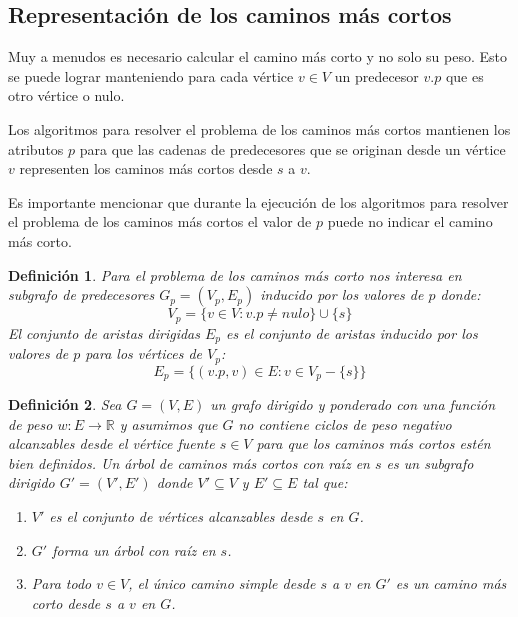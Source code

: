\documentclass[12pt]{article}
\newcommand{\nl}{\vspace{0.3cm}}
\newtheorem{definition}{Definición}
\begin{document}
\subsection{Representación de los caminos más cortos}

\nl

Muy a menudos es necesario calcular el camino más corto y no solo su peso. Esto se puede lograr manteniendo para cada vértice $v \in V$ un predecesor $v.p$ que es otro vértice o nulo. 

\nl

Los algoritmos para resolver el problema de los caminos más cortos mantienen los atributos $p$ para que las cadenas de predecesores que se originan desde un vértice $v$ representen los caminos más cortos desde $s$ a $v$.

\nl

Es importante mencionar que durante la ejecución de los algoritmos para resolver el problema de los caminos más cortos el valor de $p$ puede no indicar el camino más corto.

\begin{definition}
	Para el problema de los caminos más corto nos interesa en subgrafo de predecesores $G_p = (V_p, E_p)$ inducido por los valores de $p$ donde:
	$$ V_p = \{v \in V: v.p \neq nulo \} \cup \{s\} $$
	El conjunto de aristas dirigidas $E_p$ es el conjunto de aristas inducido por los valores de $p$ para los vértices de $V_p$:
	$$E_p = \{ (v.p, v) \in E: v \in V_p - \{ s \} \}$$
\end{definition}

\begin{definition}
	Sea $G = (V, E)$ un grafo dirigido y ponderado con una función de peso $w: E \rightarrow \mathbb{R} $ y asumimos que $G$ no contiene ciclos de peso negativo alcanzables desde el vértice fuente $s \in V$ para que los caminos más cortos estén bien definidos. Un árbol de caminos más cortos con raíz en $s$ es un subgrafo dirigido $G' = (V', E')$ donde $V' \subseteq V$ y $E' \subseteq E$ tal que:
	\begin{enumerate}
		\item $V'$ es el conjunto de vértices alcanzables desde $s$ en $G$.
		\item $G'$ forma un árbol con raíz en $s$.
		\item Para todo $v \in V$, el único camino simple desde $s$ a $v$ en $G'$ es un camino más corto desde $s$ a $v$ en $G$.
	\end{enumerate}
\end{definition}
\end{document}
